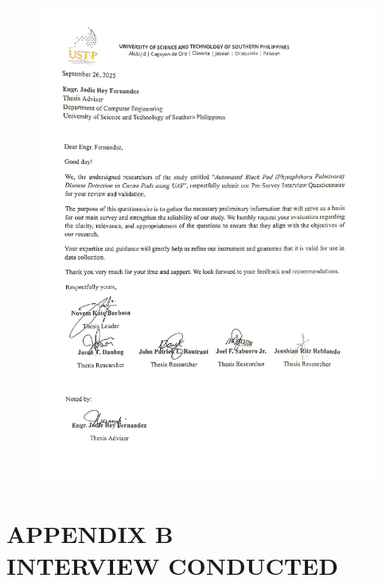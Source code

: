 \begin{figure}[H]
	\centering
	\includegraphics[width=1\textwidth]{appendix_pdf/appendix_a2.pdf}
\end{figure}


\clearpage
\chapter*{APPENDIX B \\ \normalfont INTERVIEW CONDUCTED}




